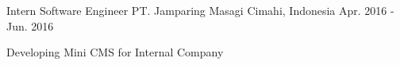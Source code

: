 \begin{cventries}
  \cventry
    {Intern Software Engineer} %
    {PT. Jamparing Masagi} %
    {Cimahi, Indonesia} %
    {Apr. 2016 - Jun. 2016} %
    {
      \begin{cvitems} %
        \item {Developing Mini CMS for Internal Company}
      \end{cvitems}
    }

\end{cventries}